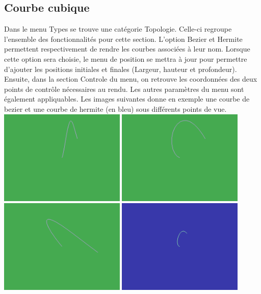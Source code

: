 \subsection{Courbe cubique}
Dans le menu Types se trouve une catégorie Topologie. Celle-ci regroupe l'ensemble des fonctionnalités pour cette section. L'option Bezier et Hermite permettent respectivement de rendre les courbes associées à leur nom. Lorsque cette option sera choisie, le menu de position se mettra à jour pour permettre d'ajouter les positions initiales et finales (Largeur, hauteur et profondeur). Ensuite, dans la section Controle du menu, on retrouve les coordonnées des deux points de contrôle nécessaires au rendu. Les autres paramètres du menu sont également appliquables. Les images suivantes donne en exemple une courbe de bezier et une courbe de hermite (en bleu) sous différents points de vue.\\
\includegraphics[width=6cm]{fig/beziercurve(1).png}
\includegraphics[width=6cm]{fig/beziercurve(2).png}
\includegraphics[width=6cm]{fig/beziercurve(3).png}
\includegraphics[width=6cm]{fig/hermitecurve1.png}
